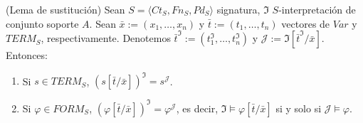 \begin{theorem}(Lema de sustitución)
Sean $S = \langle Ct_{S}, Fn_{S}, Pd_{S}\rangle$ signatura, $\mathfrak{I}$ $S$-interpretación de conjunto soporte $A$. Sean $\bar{x} := (x_1, \dots, x_n)$ y $\bar{t} := (t_1, \dots, t_n)$ vectores de $Var$ y $TERM_S$, respectivamente. Denotemos $\bar{t}^{\mathfrak{I}} := (t_1^{\mathfrak{I}}, \dots, t_n^{\mathfrak{I}})$ y $\mathcal{J} := \mathfrak{I}[\bar{t}^{\mathfrak{I}}/\bar{x}]$.
Entonces:
\begin{enumerate}
    \item Si $s \in TERM_S$, $(s[\bar{t}/\bar{x}])^{\mathfrak{I}} = s^{\mathcal{J}}$.
    \item Si $\varphi \in FORM_S$, $(\varphi[\bar{t}/\bar{x}])^{\mathfrak{I}} = \varphi^{\mathcal{J}}$, es decir, $\mathfrak{I} \vDash \varphi[\bar{t}/\bar{x}]$ si y solo si $\mathcal{J} \vDash \varphi$.
\end{enumerate}
\end{theorem}
